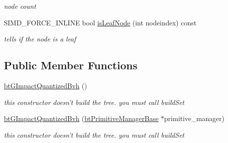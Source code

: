 \begin{CompactItemize}
\begin{CompactList}\small\item\em node count \item\end{CompactList}\item 
\hypertarget{classbt_g_impact_quantized_bvh_2c4d9b99bc0e575b3f02e9cefda1fb18}{
SIMD\_\-FORCE\_\-INLINE bool \hyperlink{classbt_g_impact_quantized_bvh_2c4d9b99bc0e575b3f02e9cefda1fb18}{isLeafNode} (int nodeindex) const }
\label{classbt_g_impact_quantized_bvh_2c4d9b99bc0e575b3f02e9cefda1fb18}

\begin{CompactList}\small\item\em tells if the node is a leaf \item\end{CompactList}\end{CompactItemize}
\subsection*{Public Member Functions}
\begin{CompactItemize}
\item 
\hypertarget{classbt_g_impact_quantized_bvh_3adf6c64b003214564e045326e4fabb7}{
\hyperlink{classbt_g_impact_quantized_bvh_3adf6c64b003214564e045326e4fabb7}{btGImpactQuantizedBvh} ()}
\label{classbt_g_impact_quantized_bvh_3adf6c64b003214564e045326e4fabb7}

\begin{CompactList}\small\item\em this constructor doesn't build the tree. you must call buildSet \item\end{CompactList}\item 
\hypertarget{classbt_g_impact_quantized_bvh_567d06bf430c21fe4887f1b996bb6ba4}{
\hyperlink{classbt_g_impact_quantized_bvh_567d06bf430c21fe4887f1b996bb6ba4}{btGImpactQuantizedBvh} (\hyperlink{classbt_primitive_manager_base}{btPrimitiveManagerBase} $\ast$primitive\_\-manager)}
\label{classbt_g_impact_quantized_bvh_567d06bf430c21fe4887f1b996bb6ba4}

\begin{CompactList}\small\item\em this constructor doesn't build the tree. you must call buildSet \item\end{CompactList}\end{CompactItemize}


